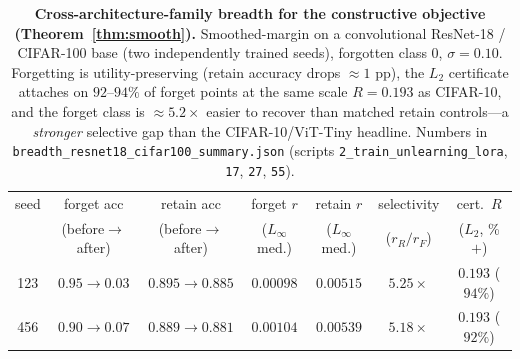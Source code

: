 \documentclass[11pt]{article}
\begin{document}
\begin{table}[t]
  \centering
  \small
  \setlength{\tabcolsep}{5pt}
  \begin{tabular}{c c c c c c c}
    \toprule
    seed & forget acc & retain acc & forget $r$ & retain $r$ & selectivity & cert.\ $R$ \\
     & (before$\to$after) & (before$\to$after) & ($L_\infty$ med.) & ($L_\infty$ med.) & ($r_R/r_F$) & ($L_2$, \%${+}$) \\
    \midrule
    123 & $0.95\to0.03$ & $0.895\to0.885$ & $0.00098$ & $0.00515$ & $5.25\times$ & $0.193$ ($94\%$) \\
    456 & $0.90\to0.07$ & $0.889\to0.881$ & $0.00104$ & $0.00539$ & $5.18\times$ & $0.193$ ($92\%$) \\
    \bottomrule
  \end{tabular}
  \caption{\textbf{Cross-architecture-family breadth for the constructive
  objective (Theorem~\ref{thm:smooth}).} Smoothed-margin on a convolutional
  ResNet-18 / CIFAR-100 base (two independently trained seeds), forgotten class
  $0$, $\sigma=0.10$. Forgetting is utility-preserving (retain accuracy drops
  $\approx\!1$ pp), the $L_2$ certificate attaches on $92$--$94\%$ of forget
  points at the same scale $R=0.193$ as CIFAR-10, and the forget class is
  $\approx\!5.2\times$ easier to recover than matched retain controls---a
  \emph{stronger} selective gap than the CIFAR-10/ViT-Tiny headline. Numbers in
  \texttt{breadth\_resnet18\_cifar100\_summary.json} (scripts
  \texttt{2\_train\_unlearning\_lora}, \texttt{17}, \texttt{27}, \texttt{55}).}
  \label{tab:breadth}
\end{table}
\end{document}
